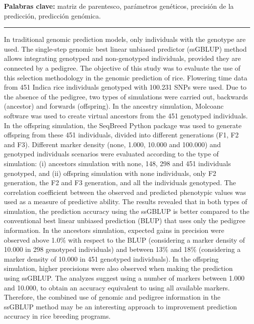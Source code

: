 \documentclass[11pt,spanish,a4paper,oneside,]{book} %
\begin{document}
\hspace*{1em}

\noindent 
\textbf{Palabras clave:} matriz de parentesco, parámetros genéticos, precisión de la predicción, predicción genómica.

\begin{center}\rule{0.5\linewidth}{0.5pt}\end{center}

\noindent 
In traditional genomic prediction models, only individuals with the genotype are used. The single-step genomic best linear unbiased predictor (ssGBLUP) method allows integrating genotyped and non-genotyped individuals, provided they are connected by a pedigree. The objective of this study was to evaluate the use of this selection methodology in the genomic prediction of rice. Flowering time data from 451 Indica rice individuals genotyped with 100.231 SNPs were used. Due to the absence of the pedigree, two types of simulations were carried out, backwards (ancestor) and forwards (offspring). In the ancestry simulation, Molcoanc software was used to create virtual ancestors from the 451 genotyped individuals. In the offspring simulation, the SeqBreed Python package was used to generate offspring from these 451 individuals, divided into different generations (F1, F2 and F3). Different marker density (none, 1.000, 10.000 and 100.000) and genotyped individuals scenarios were evaluated according to the type of simulation: (i) ancestors simulation with none, 148, 298 and 451 individuals genotyped, and (ii) offspring simulation with none individuals, only F2 generation, the F2 and F3 generation, and all the individuals genotyped. The correlation coefficient between the observed and predicted phenotypic values was used as a measure of predictive ability. The results revealed that in both types of simulation, the prediction accuracy using the ssGBLUP is better compared to the conventional best linear unbiased prediction (BLUP) that uses only the pedigree information. In the ancestors simulation, expected gains in precision were observed above 1.0\% with respect to the BLUP (considering a marker density of 10.000 in 298 genotyped individuals) and between 13\% and 18\% (considering a marker density of 10.000 in 451 genotyped individuals). In the offspring simulation, higher precisions were also observed when making the prediction using ssGBLUP. The analyzes suggest using a number of markers between 1.000 and 10.000, to obtain an accuracy equivalent to using all available markers. Therefore, the combined use of genomic and pedigree information in the ssGBLUP method may be an interesting approach to improvement prediction accuracy in rice breeding programs.
\end{document}
